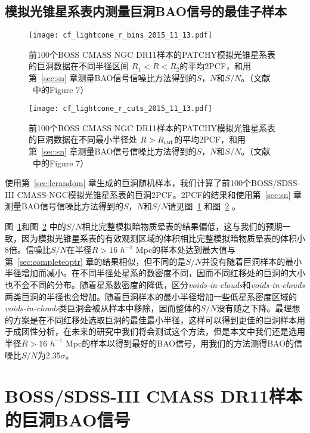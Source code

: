 {\subsection{模拟光锥星系表内测量巨洞BAO信号的最佳子样本}
\label{sec:lcoptr}

\begin{figure}
\centering
\texttt{[image: cf\_lightcone\_r\_bins\_2015\_11\_13.pdf]}
\caption{前100个BOSS CMASS NGC DR11样本的\textsc{PATCHY}模拟光锥星系表的巨洞数据在不同半径区间 $R_1 < R < R_2$的平均2PCF，和用第~\ref{sec:sn} 章测量BAO信号信噪比方法得到的$S$，$N$和$S/N$。（文献 ~中的Figure 7）}
\label{fig:cf_lightcone_r_bins}
\end{figure}

\begin{figure}
\centering
\texttt{[image: cf\_lightcone\_r\_cuts\_2015\_11\_13.pdf]}
\caption{前100个BOSS CMASS NGC DR11样本的\textsc{PATCHY}模拟光锥星系表的巨洞数据在不同最小半径处 $R>R_{\rm cut}$的平均2PCF，和用第~\ref{sec:sn} 章测量BAO信号信噪比方法得到的$S$，$N$和$S/N$。（文献 ~中的Figure 7）}
\label{fig:cf_lightcone_r_cuts}
\end{figure}

使用第~\ref{sec:lcrandom} 章生成的巨洞随机样本，我们计算了前100个BOSS/SDSS-III CMASS-NGC模拟光锥星系表的巨洞2PCF。2PCF的结果和使用第~\ref{sec:sn} 章测量BAO信号信噪比方法得到的$S$，$N$和$S/N$请见图~\ref{fig:cf_lightcone_r_bins} 和图~\ref{fig:cf_lightcone_r_cuts} 。

图~\ref{fig:cf_lightcone_r_bins}和图~\ref{fig:cf_lightcone_r_cuts} 中的$S/N$相比完整模拟暗物质晕表的结果偏低，这与我们的预期一致，因为模拟光锥星系表的有效观测区域的体积相比完整模拟暗物质晕表的体积小8倍。信噪比$S/N$在半径$R > 16$ $h^{-1}$ Mpc的样本处达到最大值与第~\ref{sec:completeoptr} 章的结果相似，但不同的是$S/N$并没有随着巨洞样本的最小半径增加而减小。在不同半径处星系的数密度不同，因而不同红移处的巨洞的大小也不会不同的分布。随着星系数密度的降低，区分\textit{voids-in-clouds}和\textit{voids-in-clouds}两类巨洞的半径也会增加。随着巨洞样本的最小半径增加一些低星系密度区域的\textit{voids-in-clouds}类巨洞会被从样本中移除，因而整体的$S/N$没有随之下降。最理想的方案是在不同红移处选取巨洞的最佳最小半径，这样可以得到更佳的巨洞样本用于成团性分析，在未来的研究中我们将会测试这个方法，但是本文中我们还是选用半径$R > 16$ $h^{-1}$ Mpc的样本以得到最好的BAO信号，用我们的方法测得BAO的信噪比$S/N$为2.35$\sigma$。

\section{BOSS/SDSS-III CMASS DR11样本的巨洞BAO信号}
\label{sec:dr11}

}
